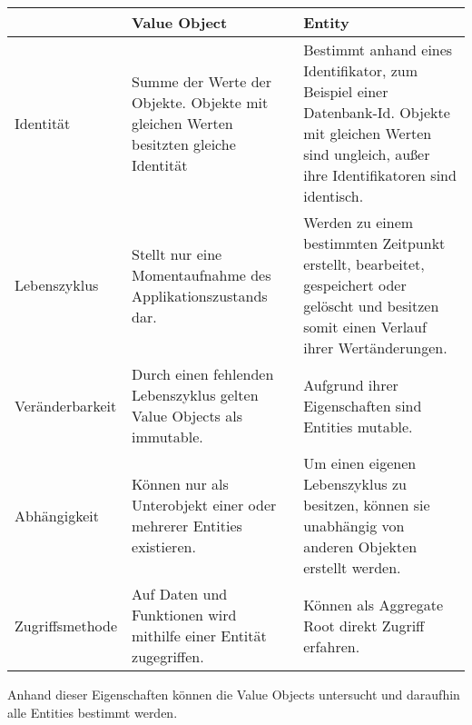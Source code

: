 \begin{tabular}{ | p{} | p{} | p{} | } 
	\hline
	& {\textbf{\centering Value Object} } & \textbf{\centering Entity} \\ 
	\hline
	Identität & 
	Summe der Werte der Objekte. Objekte mit gleichen Werten besitzten gleiche Identität & 
	Bestimmt anhand eines Identifikator, zum Beispiel einer Datenbank-Id. Objekte mit gleichen Werten sind ungleich, außer ihre Identifikatoren sind identisch. \\ 
	\hline
	Lebenszyklus & 
	Stellt nur eine Momentaufnahme des Applikationszustands dar. &
	Werden zu einem bestimmten Zeitpunkt erstellt, bearbeitet, gespeichert oder gelöscht und besitzen somit einen Verlauf ihrer Wertänderungen.  \\ 
	\hline
	Veränderbarkeit & 
	Durch einen fehlenden Lebenszyklus gelten Value Objects als immutable. &
	Aufgrund ihrer Eigenschaften sind Entities mutable.  \\ 
	\hline
	Abhängigkeit & 
	Können nur als Unterobjekt einer oder mehrerer Entities existieren. &
	Um einen eigenen Lebenszyklus zu besitzen, können sie unabhängig von anderen Objekten erstellt werden.  \\ 
	\hline
	Zugriffsmethode & 
	Auf Daten und Funktionen wird mithilfe einer Entität zugegriffen. &
	Können als Aggregate Root direkt Zugriff erfahren. \\ 
	\hline
\end{tabular}

Anhand dieser Eigenschaften können die Value Objects untersucht und daraufhin alle Entities bestimmt werden.


